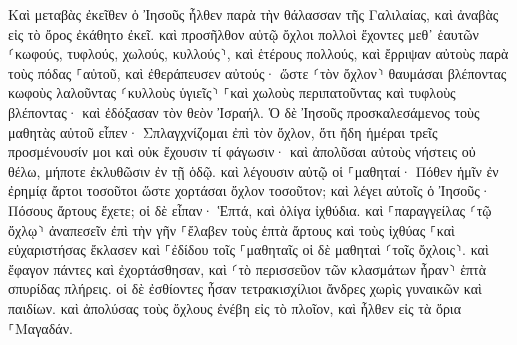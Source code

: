 \documentclass[twoside, 9pt]{extreport}
\begin{document}
Καὶ μεταβὰς ἐκεῖθεν ὁ Ἰησοῦς ἦλθεν παρὰ τὴν θάλασσαν τῆς Γαλιλαίας, καὶ ἀναβὰς εἰς τὸ ὄρος ἐκάθητο ἐκεῖ. 
καὶ προσῆλθον αὐτῷ ὄχλοι πολλοὶ ἔχοντες μεθ᾽ ἑαυτῶν ⸂κωφούς, τυφλούς, χωλούς, κυλλούς⸃, καὶ ἑτέρους πολλούς, καὶ ἔρριψαν αὐτοὺς παρὰ τοὺς πόδας ⸀αὐτοῦ, καὶ ἐθεράπευσεν αὐτούς· 
ὥστε ⸂τὸν ὄχλον⸃ θαυμάσαι βλέποντας κωφοὺς λαλοῦντας ⸂κυλλοὺς ὑγιεῖς⸃ ⸀καὶ χωλοὺς περιπατοῦντας καὶ τυφλοὺς βλέποντας· καὶ ἐδόξασαν τὸν θεὸν Ἰσραήλ. 
Ὁ δὲ Ἰησοῦς προσκαλεσάμενος τοὺς μαθητὰς αὐτοῦ εἶπεν· Σπλαγχνίζομαι ἐπὶ τὸν ὄχλον, ὅτι ἤδη ἡμέραι τρεῖς προσμένουσίν μοι καὶ οὐκ ἔχουσιν τί φάγωσιν· καὶ ἀπολῦσαι αὐτοὺς νήστεις οὐ θέλω, μήποτε ἐκλυθῶσιν ἐν τῇ ὁδῷ. 
καὶ λέγουσιν αὐτῷ οἱ ⸀μαθηταί· Πόθεν ἡμῖν ἐν ἐρημίᾳ ἄρτοι τοσοῦτοι ὥστε χορτάσαι ὄχλον τοσοῦτον; 
καὶ λέγει αὐτοῖς ὁ Ἰησοῦς· Πόσους ἄρτους ἔχετε; οἱ δὲ εἶπαν· Ἑπτά, καὶ ὀλίγα ἰχθύδια. 
καὶ ⸀παραγγείλας ⸂τῷ ὄχλῳ⸃ ἀναπεσεῖν ἐπὶ τὴν γῆν 
⸀ἔλαβεν τοὺς ἑπτὰ ἄρτους καὶ τοὺς ἰχθύας ⸀καὶ εὐχαριστήσας ἔκλασεν καὶ ⸀ἐδίδου τοῖς ⸀μαθηταῖς οἱ δὲ μαθηταὶ ⸂τοῖς ὄχλοις⸃. 
καὶ ἔφαγον πάντες καὶ ἐχορτάσθησαν, καὶ ⸂τὸ περισσεῦον τῶν κλασμάτων ἦραν⸃ ἑπτὰ σπυρίδας πλήρεις. 
οἱ δὲ ἐσθίοντες ἦσαν τετρακισχίλιοι ἄνδρες χωρὶς γυναικῶν καὶ παιδίων. 
καὶ ἀπολύσας τοὺς ὄχλους ἐνέβη εἰς τὸ πλοῖον, καὶ ἦλθεν εἰς τὰ ὅρια ⸀Μαγαδάν. 
\end{document}
